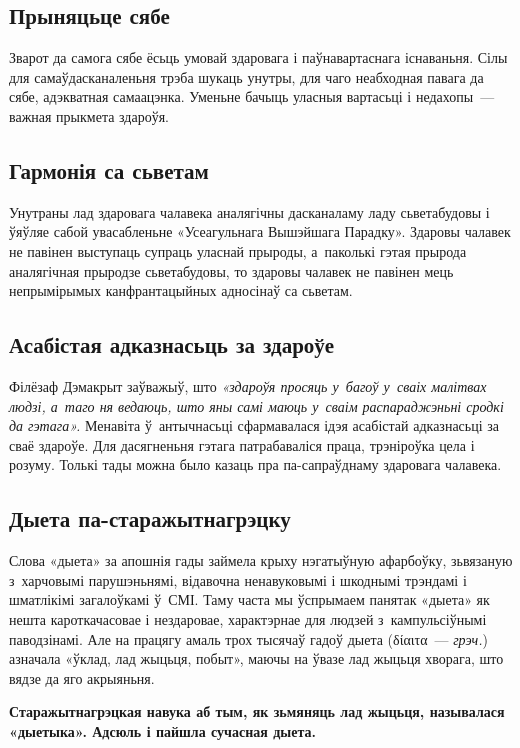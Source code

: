 \subsection*{Прыняцьце сябе} 

Зварот да самога сябе ёсьць умовай здаровага і паўнавартаснага існаваньня. Сілы для самаўдасканаленьня трэба шукаць унутры, для чаго неабходная павага да сябе, адэкватная самаацэнка. Уменьне бачыць уласныя вартасьці і недахопы~--- важная прыкмета здароўя.

\subsection*{Гармонія са сьветам}

Унутраны лад здаровага чалавека аналягічны дасканаламу ладу сьветабудовы і ўяўляе сабой увасабленьне «Усеагульнага Вышэйшага Парадку». Здаровы чалавек не павінен выступаць супраць уласнай прыроды, а~паколькі гэтая прырода аналягічная прыродзе сьветабудовы, то здаровы чалавек не павінен мець непрымірымых канфрантацыйных адносінаў са сьветам.

\subsection*{Асабістая адказнасьць за здароўе} 

Філёзаф Дэмакрыт заўважыў, што \emph{«здароўя просяць у~багоў у~сваіх малітвах людзі, а~таго ня ведаюць, што яны самі маюць у~сваім распараджэньні сродкі да гэтага».} Менавіта ў~антычнасьці сфармавалася ідэя асабістай адказнасьці за сваё здароўе. Для дасягненьня гэтага патрабаваліся праца, трэніроўка цела і розуму. Толькі тады можна было казаць пра па-сапраўднаму здаровага чалавека.

\subsection*{Дыета па-старажытнагрэцку} 

Слова «дыета» за апошнія гады займела крыху нэгатыўную афарбоўку, зьвязаную з~харчовымі парушэньнямі, відавочна ненавуковымі і шкоднымі трэндамі і шматлікімі загалоўкамі ў~СМІ. Таму часта мы ўспрымаем панятак «дыета» як нешта кароткачасовае і нездаровае, характэрнае для людзей з~кампульсіўнымі паводзінамі. Але на працягу амаль трох тысячаў гадоў дыета (δίαιτα~--- \emph{грэч.}) азначала «ўклад, лад жыцьця, побыт», маючы на ўвазе лад жыцьця хворага, што вядзе да яго акрыяньня. 

\textbf{Старажытнагрэцкая навука аб тым, як зьмяняць лад жыцьця, называлася «дыетыка». Адсюль і пайшла сучасная дыета.}

